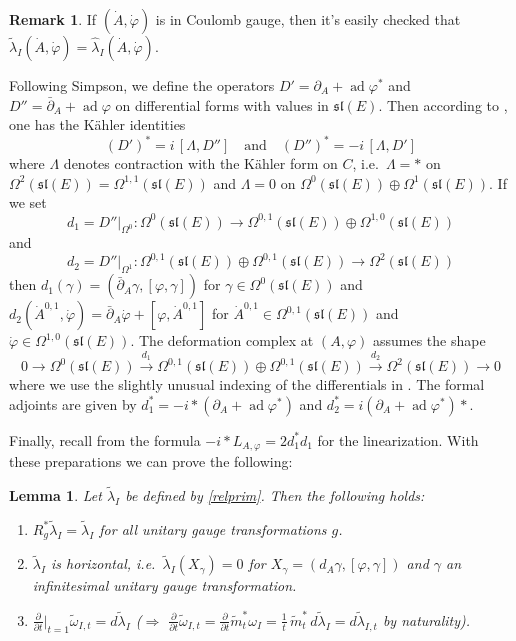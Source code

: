 \documentclass[12pt,letterpaper,reqno]{amsart}
\newtheorem{lem}[thm]{Lemma}
\theoremstyle{remark}
\theoremstyle{definition}
\newtheorem{rem}[thm]{Remark}
\numberwithin{thm}{section}
\numberwithin{equation}{section}
\numberwithin{figure}{section}
\DeclareMathOperator{\ad}{ad}
\begin{document}
\begin{rem}
If $(\dot A, \dot \varphi)$ is in Coulomb gauge, then it's easily checked that $\tilde \lambda_I(\dot A, \dot \varphi) = \hat\lambda_I(\dot A, \dot \varphi)$.
\end{rem}
 



Following Simpson, we define the operators $D' = \partial_A + \ad \varphi^*$ and $D'' = \bar\partial_A + \ad \varphi$ on differential forms with values in $\mathfrak{sl}(E)$.  Then according to  \cite{simpsonhiggs},  one has the K\"ahler identities
\[
(D')^* = i \,[ \Lambda, D''] \quad  \text{and} \quad (D'')^* = - i \,[ \Lambda, D']
\]
where $\Lambda$ denotes contraction with the K\"ahler form on $C$, i.e.\ $\Lambda = \ast$ on $\Omega^2(\mathfrak{sl}(E)) = \Omega^{1,1}(\mathfrak{sl}(E))$ and $\Lambda = 0$ on $\Omega^0(\mathfrak{sl}(E)) \oplus \Omega^1(\mathfrak{sl}(E)) $. If we set 
\[
d_1 = D''\vert_{\Omega^0}: \Omega^0(\mathfrak{sl}(E)) \to \Omega^{0,1}(\mathfrak{sl}(E)) \oplus \Omega^{1,0}(\mathfrak{sl}(E))\] 
and  
\[
d_2= D''\vert_{\Omega^1}: \Omega^{0,1}(\mathfrak{sl}(E)) \oplus \Omega^{0,1}(\mathfrak{sl}(E)) \to \Omega^2(\mathfrak{sl}(E))
\]
then $d_1(\gamma) = (\bar\partial_A \gamma, [ \varphi, \gamma])$ for $\gamma \in \Omega^0(\mathfrak{sl}(E))$ and $d_2(\dot A^{0,1}, \dot \varphi) = \bar\partial_A \dot \varphi + [\varphi,\dot A^{0,1}]$ for $\dot A^{0,1} \in \Omega^{0,1}(\mathfrak{sl}(E)) $ and $\dot \varphi \in  \Omega^{1,0}(\mathfrak{sl}(E))$. The deformation complex at $(A,\varphi)$ assumes the shape 
\[
0 \to \Omega^0(\mathfrak{sl}(E)) \overset{d_1}{\longrightarrow}  \Omega^{0,1}(\mathfrak{sl}(E)) \oplus \Omega^{0,1}(\mathfrak{sl}(E)) \overset{d_2}{\longrightarrow} \Omega^2(\mathfrak{sl}(E)) \to 0
\]
where we use the slightly unusual indexing of the differentials in \cite{collier2024conformallimitsparabolicslnchiggs}. The formal adjoints are given by $d_1^* = - i \ast (\partial_A +  \ad \varphi^*)$ and $d_2^* = i (\partial_A +  \ad \varphi^*) \ast$. 

Finally, recall from \cite{MSWW14} the formula $- i \ast L_{A,\varphi} = 2 d_1^* d_1$ for the linearization. With these preparations we can prove the following:
\begin{lem}
Let $\tilde \lambda_I$ be defined by \eqref{relprim}. Then the following holds: 
	\begin{enumerate}
	\item $R_g^* \tilde \lambda_I = \tilde \lambda_I $ for all unitary gauge transformations $g$.
	\smallskip
	\item $\tilde \lambda_I$ is horizontal, i.e.\ $\tilde \lambda_{I}(X_\gamma) =0 $ for $X_\gamma = (d_A \gamma, [\varphi, \gamma])$ and $\gamma$ an infinitesimal unitary gauge transformation.
	\smallskip
	\item $\frac{\partial}{\partial t}\bigr\vert_{t=1} \tilde\omega_{I,t} = d \tilde \lambda_I$ ($\Longrightarrow$ $\frac{\partial}{\partial t} \tilde \omega_{I,t} = \frac{\partial}{\partial t}  \tilde m_t^* \omega_I  =  \frac{1}{t} \, \tilde m_t^* \, d \tilde\lambda_{I} = d \tilde \lambda_{I,t}$ by naturality).
\end{enumerate}
\label{lem:primitive}
\end{lem}
\end{document}
